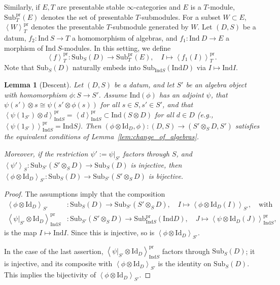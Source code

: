 \documentclass[11pt]{amsart}
\theoremstyle{definition}
\theoremstyle{plain}
\newtheorem{lem}[defn]{Lemma}
\theoremstyle{remark}
\newcommand{\Ind}{\mathrm{Ind}}
\newcommand{\Sub}{\mathrm{Sub}}
\newcommand{\mo}{\mathrm}
\newcommand{\Id}{\mathrm{Id}}
\newcommand{\ang}[1]{{\left\langle{#1}\right\rangle}}
\numberwithin{equation}{section}
\begin{document}
Similarly, if \(E,T\) are presentable stable \(\infty\)-categories and \(E\) is a \(T\)-module, \(\Sub_T^{\mo{pr}}(E)\) denotes the set of presentable \(T\)-submodules.
For a subset \(W\subset E\), \(\ang{W}_T^{\mo{pr}}\) denotes the presentable \(T\)-submodule generated by \(W\).
Let \((D,S)\) be a datum, \(f_2:\Ind ~S\to T\) a homomorphism of algebras, and \(f_1:\Ind~ D\to E\) a morphism of \(\Ind~ S\)-modules. 
In this setting, we define
\[
\ang{f}_T^{\mo{pr}}:\Sub_S(D)\longrightarrow \Sub_T^{\mo{pr}}(E),\quad 
I \longmapsto \ang{f_1(I)}_T^{\mo{pr}}.
\]
Note that \(\Sub_S(D)\) naturally embeds into \(\Sub_{\Ind S}(\Ind D)\) via \(I \mapsto \Ind I\).


\begin{lem}[Descent]\label{lem:descent}
  Let \((D,S)\) be a datum, and let \(S'\) be an algebra object with homomorphism \(\phi:S\to S'\).
  Assume \(\Ind(\phi)\) has an adjoint \(\psi\), that \(\psi(s')\otimes s\cong \psi(s'\otimes \phi(s))\) for all \(s\in S, s'\in S'\), and that
  \(\ang{\psi(1_{S'})\otimes d}^{\mo{pr}}_{\Ind S}=\ang{d}^{\mo{pr}}_{\Ind S}\subset \Ind(S\otimes D)\) for all \(d\in D\) (e.g., \(\ang{\psi(1_{S'})}^{\mo{pr}}_{\Ind S}=\Ind S\)).
  Then \((\phi\otimes \Id_D,\phi):(D,S)\to (S'\otimes_S D,S')\) satisfies the equivalent conditions of Lemma~\ref{lem:change_of_algebras}.

  Moreover, if the restriction \(\psi':=\psi|_{S'}\) factors through \(S\), and \(\ang{\psi'}_S:\Sub_{S'}(S'\otimes_S D)\to\Sub_S(D)\) is injective, then
  \(\ang{\phi\otimes \Id_D}_{S'}:\Sub_S(D)\to \Sub_{S'}(S'\otimes_S D)\) is bijective.
\end{lem}
\begin{proof}
  The assumptions imply that the composition 
  \begin{align*}
  \ang{\phi\otimes \Id_D}_{S'}&:\Sub_S(D)\to \Sub_{S'}(S'\otimes_S D),\quad I\mapsto \ang{\phi\otimes \Id_D(I)}_{S'}, \quad\text{with}\\
  \ang{\psi|_{S'}\otimes \Id_{D}}^{\mo{pr}}_{\Ind S}&:\Sub_{S'}(S'\otimes_S D)\to \Sub_{\Ind S}^{\mo{pr}}(\Ind D),\quad J\mapsto \ang{\psi\otimes \Id_{D}(J)}^{\mo{pr}}_{\Ind S},\end{align*}
  is the map \(I\mapsto \Ind I\).
  Since this is injective, so is \(\ang{\phi\otimes \Id_D}_{S'}\).

  In the case of the last assertion, \(\ang{\psi|_{S'}\otimes \Id_{D}}^{\mo{pr}}_{\Ind S}\) factors through \(\Sub_S(D)\); it is injective, and its composite with \(\ang{\phi\otimes \Id_D}_{S'}\) is the identity on \(\Sub_S(D)\).
  This implies the bijectivity of \(\ang{\phi\otimes \Id_D}_{S'}\).
\end{proof}
\end{document}
